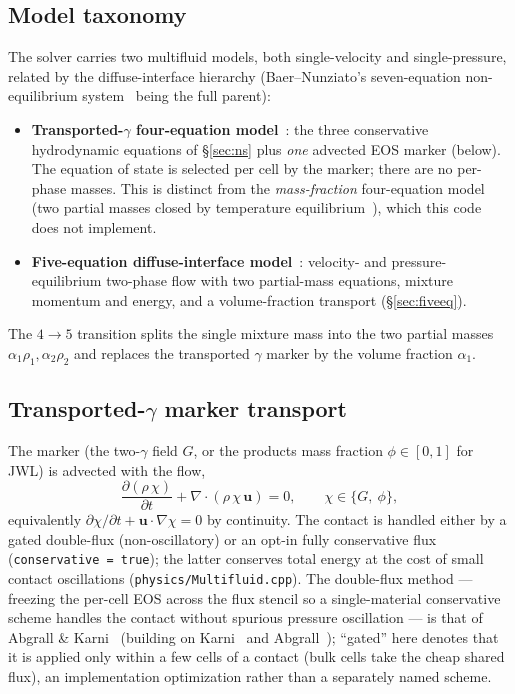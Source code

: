 \documentclass[11pt]{article}
\newcommand{\dpar}[2]{\frac{\partial #1}{\partial #2}}
\newcommand{\uvec}{\mathbf{u}}
\newcommand{\code}[1]{\texttt{#1}}
\begin{document}
\subsection{Model taxonomy}
The solver carries two multifluid models, both single-velocity and
single-pressure, related by the diffuse-interface hierarchy (Baer--Nunziato's
seven-equation non-equilibrium system~\cite{baer_nunziato_1986} being the full parent):
\begin{itemize}
\item \textbf{Transported-$\gamma$ four-equation model}~\cite{shyue_1998,abgrall_karni_2001,karni_1994,abgrall_1996}:
  the three conservative hydrodynamic equations of
  \S\ref{sec:ns} plus \emph{one} advected EOS marker (below). The equation of
  state is selected per cell by the marker; there are no per-phase masses. This
  is distinct from the \emph{mass-fraction} four-equation model
  (two partial masses closed by temperature equilibrium~\cite{murrone_guillard_2005}), which this code does
  not implement.
\item \textbf{Five-equation diffuse-interface model}~\cite{allaire_2002,kapila_2001}:
  velocity- and pressure-equilibrium two-phase flow with two partial-mass
  equations, mixture momentum and energy, and a volume-fraction transport
  (\S\ref{sec:fiveeq}).
\end{itemize}
The $4\!\to\!5$ transition splits the single mixture mass into the two partial
masses $\alpha_1\rho_1,\alpha_2\rho_2$ and replaces the transported $\gamma$
marker by the volume fraction $\alpha_1$.

\subsection{Transported-$\gamma$ marker transport}
\label{sec:gammatransport}
The marker (the two-$\gamma$ field $G$, or the products mass fraction
$\phi\in[0,1]$ for JWL) is advected with the flow,
\begin{equation}
\dpar{(\rho\,\chi)}{t} + \nabla\!\cdot(\rho\,\chi\,\uvec) = 0,
\qquad \chi \in \{G,\ \phi\},
\end{equation}
equivalently $\partial\chi/\partial t + \uvec\cdot\nabla\chi = 0$ by continuity.
The contact is handled either by a gated double-flux (non-oscillatory) or an
opt-in fully conservative flux (\code{conservative = true}); the latter conserves
total energy at the cost of small contact oscillations
(\code{physics/Multifluid.cpp}). The double-flux method --- freezing the per-cell
EOS across the flux stencil so a single-material conservative scheme handles the
contact without spurious pressure oscillation --- is that of
Abgrall \& Karni~\cite{abgrall_karni_2001} (building on
Karni~\cite{karni_1994} and Abgrall~\cite{abgrall_1996}); ``gated'' here denotes
that it is applied only within a few cells of a contact (bulk cells take the
cheap shared flux), an implementation optimization rather than a separately
named scheme.
\end{document}
